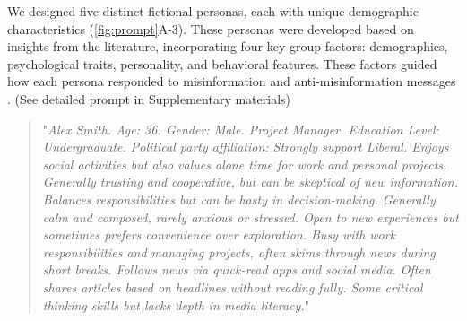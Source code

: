 We designed five distinct fictional personas, each with unique demographic characteristics (\autoref{fig:prompt}A-3). These personas were developed based on insights from the literature, incorporating four key group factors: demographics, psychological traits, personality, and behavioral features. These factors guided how each persona responded to misinformation and anti-misinformation messages \cite{nan2022people,liu2023checking,lee2024misinformation,shin2024understanding}. (See detailed prompt in Supplementary materials)
\begin{quote}
    "\textit{Alex Smith. Age: 36. Gender: Male. Project Manager. Education Level: Undergraduate. Political party affiliation: Strongly support Liberal. Enjoys social activities but also values alone time for work and personal projects. Generally trusting and cooperative, but can be skeptical of new information. Balances responsibilities but can be hasty in decision-making. Generally calm and composed, rarely anxious or stressed. Open to new experiences but sometimes prefers convenience over exploration. Busy with work responsibilities and managing projects, often skims through news during short breaks. Follows news via quick-read apps and social media. Often shares articles based on headlines without reading fully. Some critical thinking skills but lacks depth in media literacy.}"
\end{quote}

